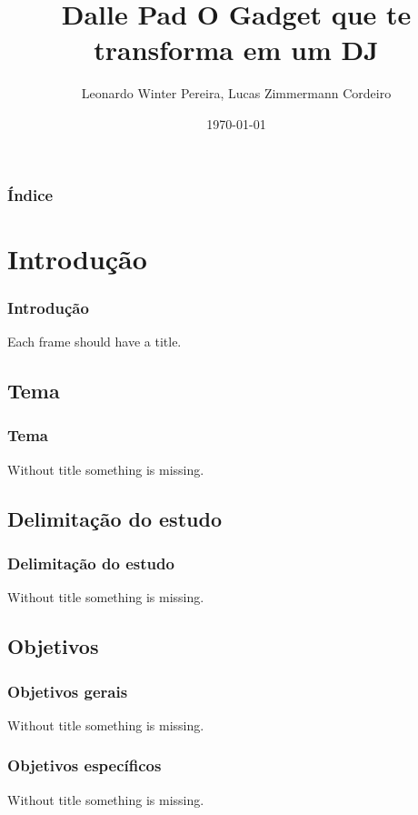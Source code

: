 \documentclass{beamer}
\begin{document}
\title{Dalle Pad \newline O Gadget que te transforma em um DJ}
\author{Leonardo Winter Pereira, Lucas Zimmermann Cordeiro}
\date{\today}

\begin{frame}
\titlepage
\end{frame}

\begin{frame}\frametitle{Índice}\tableofcontents
\end{frame}

    \section{Introdução}

    \begin{frame}\frametitle{Introdução}
    Each frame should have a title.
    \end{frame}

        \subsection{Tema}

        \begin{frame}\frametitle{Tema}
        Without title something is missing.
        \end{frame}

        \subsection{Delimitação do estudo}

        \begin{frame}\frametitle{Delimitação do estudo}
        Without title something is missing.
        \end{frame}

        \subsection{Objetivos}

        \begin{frame}\frametitle{Objetivos gerais}
        Without title something is missing.
        \end{frame}

        \begin{frame}\frametitle{Objetivos específicos}
        Without title something is missing.
        \end{frame}
\end{document}

